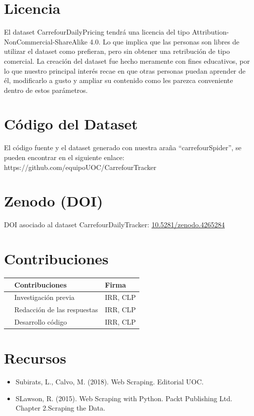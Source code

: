 \documentclass{article}
\begin{document}
\section{Licencia}
El dataset CarrefourDailyPricing tendrá una licencia del tipo Attribution-NonCommercial-ShareAlike 4.0. Lo que implica que las personas son libres de utilizar el dataset como prefieran, pero sin obtener una retribución de tipo comercial. La creación del dataset fue hecho meramente con fines educativos, por lo que nuestro principal interés recae en que otras personas puedan aprender de él, modificarlo a gusto y ampliar su contenido como les parezca conveniente dentro de estos parámetros.

\pagebreak
\section{Código del Dataset}
El código fuente y el dataset generado con nuestra araña  “carrefourSpider”, se pueden encontrar en el siguiente enlace: https://github.com/equipoUOC/CarrefourTracker

\section{Zenodo (DOI)}
DOI asociado al dataset CarrefourDailyTracker:
\href{https://doi.org/10.5281/zenodo.4265284}{10.5281/zenodo.4265284} 

\section{Contribuciones}

\begin{table}[H]
    \centering
    \begin{tabular}{rll}
    & Contribuciones & Firma \\
    \hline
    & Investigación previa & IRR, CLP  \\
    & Redacción de las respuestas & IRR, CLP \\
    & Desarrollo código & IRR, CLP \\
    \end{tabular}
\end{table}


\section{Recursos}
\begin{itemize}
    \item Subirats, L., Calvo, M. (2018). Web Scraping. Editorial UOC.
    \item SLawson, R. (2015). Web Scraping with Python. Packt Publishing Ltd. Chapter 2.Scraping the Data.

\end{itemize}
\end{document}

